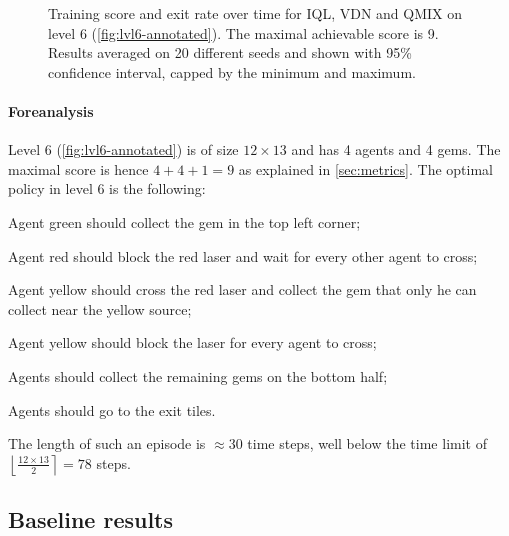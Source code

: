 \begin{figure}[t]
    \caption{Training score and exit rate over time for IQL, VDN and QMIX on level 6 (\autoref{fig:lvl6-annotated}). The maximal achievable score is 9. Results averaged on 20 different seeds and shown with 95\% confidence interval, capped by the minimum and maximum.}
    \label{fig:dqn-vdn-qmix}
\end{figure}


\paragraph{Foreanalysis}
Level 6 (\autoref{fig:lvl6-annotated}) is of size $12 \times 13$ and has 4 agents and 4 gems. The maximal score is hence $4+4+1=9$ as explained in \autoref{sec:metrics}. The optimal policy in level 6 is the following: 
\begin{enumerate*}[label=\textbf{\roman*)}]
    \item Agent green should collect the gem in the top left corner;
    \item Agent red should block the red laser and wait for every other agent to cross;
    \item Agent yellow should cross the red laser and collect the gem that only he can collect near the yellow source;
    \item Agent yellow should block the laser for every agent to cross;
    \item Agents should collect the remaining gems on the bottom half;
    \item Agents should go to the exit tiles.
\end{enumerate*}
The length of such an episode is $\approx 30$ time steps, well below the time limit of $\left\lfloor\frac{12 \times 13}{2}\right\rceil = 78$ steps.

\subsection{Baseline results}
\label{sec:results}

